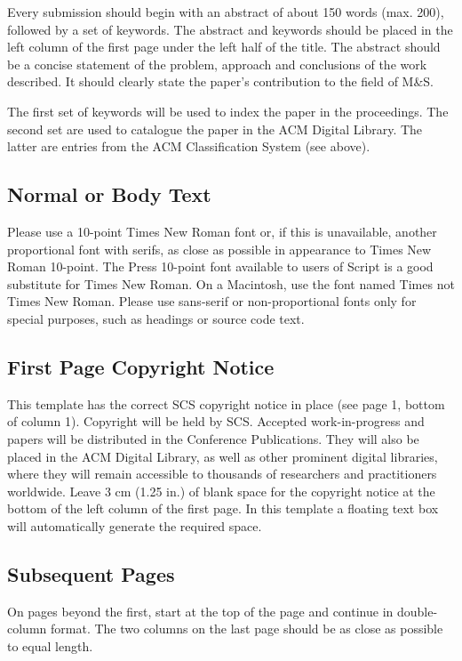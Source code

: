 \documentclass{scsPaperFormattingTemplate-LaTex-Revised20160302}
\begin{document}
Every submission should begin with an abstract of about 150 words (max. 200), followed by a set of keywords. The abstract and keywords should be placed in the left column of the first page under the left half of the title. The abstract should be a concise statement of the problem, approach and conclusions of the work described. It should clearly state the paper's contribution to the field of M\&S.

The first set of keywords will be used to index the paper in the proceedings. The second set are used to catalogue the paper in the ACM Digital Library. The latter are entries from the ACM Classification System (see above).

\subsection{Normal or Body Text}

Please use a 10-point Times New Roman font or, if this is unavailable, another proportional font with serifs, as close as possible in appearance to Times New Roman 10-point. The Press 10-point font available to users of Script is a good substitute for Times New Roman. On a Macintosh, use the font named Times not Times New Roman. Please use sans-serif or non-proportional fonts only for special purposes, such as headings or source code text.

\subsection{First Page Copyright Notice}

This template has the correct SCS copyright notice in place (see page 1, bottom of column 1). Copyright will be held by SCS. Accepted work-in-progress and papers will be distributed in the Conference Publications. They will also be placed in the ACM Digital Library, as well as other prominent digital libraries, where they will remain accessible to thousands of researchers and practitioners worldwide.  Leave 3 cm (1.25 in.) of blank space for the copyright notice at the bottom of the left column of the first page. In this template a floating text box will automatically generate the required space.

\subsection{Subsequent Pages}

On pages beyond the first, start at the top of the page and continue in double-column format. The two columns on the last page should be as close as possible to equal length.
\end{document}
